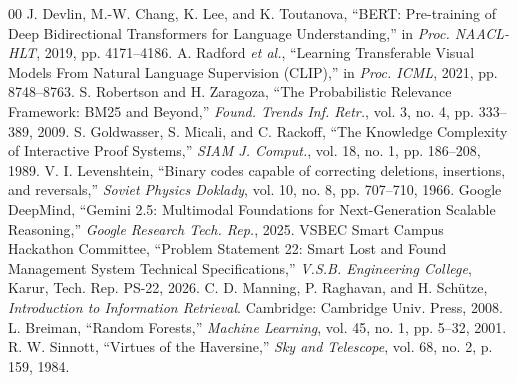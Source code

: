 \documentclass[conference]{IEEEtran}
\begin{document}
\begin{thebibliography}{00}
\footnotesize
{} J. Devlin, M.-W. Chang, K. Lee, and K. Toutanova, ``BERT: Pre-training of Deep Bidirectional Transformers for Language Understanding,'' in \textit{Proc. NAACL-HLT}, 2019, pp. 4171--4186.
 A. Radford \textit{et al.}, ``Learning Transferable Visual Models From Natural Language Supervision (CLIP),'' in \textit{Proc. ICML}, 2021, pp. 8748--8763.
 S. Robertson and H. Zaragoza, ``The Probabilistic Relevance Framework: BM25 and Beyond,'' \textit{Found. Trends Inf. Retr.}, vol. 3, no. 4, pp. 333--389, 2009.
 S. Goldwasser, S. Micali, and C. Rackoff, ``The Knowledge Complexity of Interactive Proof Systems,'' \textit{SIAM J. Comput.}, vol. 18, no. 1, pp. 186--208, 1989.
 V. I. Levenshtein, ``Binary codes capable of correcting deletions, insertions, and reversals,'' \textit{Soviet Physics Doklady}, vol. 10, no. 8, pp. 707--710, 1966.
 Google DeepMind, ``Gemini 2.5: Multimodal Foundations for Next-Generation Scalable Reasoning,'' \textit{Google Research Tech. Rep.}, 2025.
 VSBEC Smart Campus Hackathon Committee, ``Problem Statement 22: Smart Lost and Found Management System Technical Specifications,'' \textit{V.S.B. Engineering College}, Karur, Tech. Rep. PS-22, 2026.
 C. D. Manning, P. Raghavan, and H. Sch\"{u}tze, \textit{Introduction to Information Retrieval}. Cambridge: Cambridge Univ. Press, 2008.
 L. Breiman, ``Random Forests,'' \textit{Machine Learning}, vol. 45, no. 1, pp. 5--32, 2001.
 R. W. Sinnott, ``Virtues of the Haversine,'' \textit{Sky and Telescope}, vol. 68, no. 2, p. 159, 1984.
\end{thebibliography}
\end{document}
